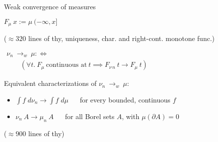 \documentclass[usepdftitle=false]{beamer}
\begin{document}
\begin{frame}{Weak convergence of measures} %

\begin{definition}%
\vspace{-2ex}
\begin{center}%
$ F_\mu~x := \mu~(-\infty, x] $
\end{center}
{($\approx 320$ lines of thy, uniqueness, char. and right-cont. monotone func.)}
\end{definition}

\pause

\begin{definition}
\vspace{-2ex}
\begin{center} 
$ \begin{array}{l} \nu_n ~{\longrightarrow}_w~ \mu :\Leftrightarrow \\
\qquad
  (\forall t.~ F_\mu~\text{continuous at}~ t \implies
       F_{\nu\,n}~t \longrightarrow F_\mu~t)
  \end{array} $
\end{center}
\end{definition}

\pause

\begin{theorem}
Equivalent characterizations of $\nu_n ~{\longrightarrow}_w~ \mu$:
\begin{itemize}
 \item $\int f \; d\nu_n \longrightarrow \int f \; d\mu$ ~~ for every bounded, continuous $f$
 \item $\nu_n~A \longrightarrow \mu_n~A$ ~~ for all Borel sets $A$, with $\mu(\partial A) = 0$
\end{itemize}
\end{theorem}

($\approx 900$ lines of thy)

\end{frame} %
\end{document}
